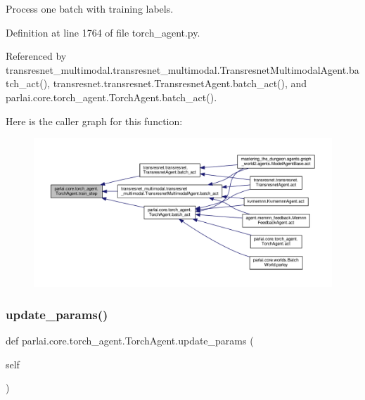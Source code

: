 \begin{DoxyVerb}[Abstract] Process one batch with training labels.\end{DoxyVerb}
 

Definition at line 1764 of file torch\+\_\+agent.\+py.



Referenced by transresnet\+\_\+multimodal.\+transresnet\+\_\+multimodal.\+Transresnet\+Multimodal\+Agent.\+batch\+\_\+act(), transresnet.\+transresnet.\+Transresnet\+Agent.\+batch\+\_\+act(), and parlai.\+core.\+torch\+\_\+agent.\+Torch\+Agent.\+batch\+\_\+act().

Here is the caller graph for this function\+:
\nopagebreak
\begin{figure}[H]
\begin{center}
\leavevmode
\includegraphics[width=350pt]{classparlai_1_1core_1_1torch__agent_1_1TorchAgent_a8ba9d535736c0af100d00c5e7b02b61b_icgraph}
\end{center}
\end{figure}
\mbox{\label{classparlai_1_1core_1_1torch__agent_1_1TorchAgent_a7e2c9e180887397daa6229a0f9700b1c}} 
\subsubsection{\texorpdfstring{update\+\_\+params()}{update\_params()}}
{\footnotesize\ttfamily def parlai.\+core.\+torch\+\_\+agent.\+Torch\+Agent.\+update\+\_\+params (\begin{DoxyParamCaption}\item[{}]{self }\end{DoxyParamCaption})}

